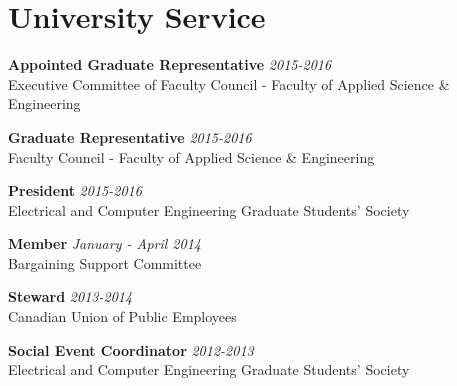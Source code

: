 \section{\sc University Service}

\textbf{Appointed Graduate Representative} \hfill \textit{2015-2016} \\
Executive Committee of Faculty Council - Faculty of Applied Science \& Engineering

\textbf{Graduate Representative} \hfill \textit{2015-2016} \\
Faculty Council - Faculty of Applied Science \& Engineering

\textbf{President} \hfill \textit{2015-2016} \\
Electrical and Computer Engineering Graduate Students' Society

\textbf{Member} \hfill \textit{January - April 2014} \\
Bargaining Support Committee

\textbf{Steward} \hfill \textit{2013-2014} \\
Canadian Union of Public Employees

\textbf{Social Event Coordinator} \hfill \textit{2012-2013} \\
Electrical and Computer Engineering Graduate Students' Society
